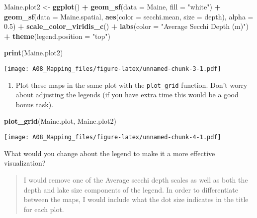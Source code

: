 \documentclass[]{article}
\newenvironment{Shaded}{\begin{snugshade}}{\end{snugshade}}
\newcommand{\DataTypeTok}[1]{\textcolor[rgb]{0.13,0.29,0.53}{#1}}
\newcommand{\FloatTok}[1]{\textcolor[rgb]{0.00,0.00,0.81}{#1}}
\newcommand{\KeywordTok}[1]{\textcolor[rgb]{0.13,0.29,0.53}{\textbf{#1}}}
\newcommand{\NormalTok}[1]{#1}
\newcommand{\OperatorTok}[1]{\textcolor[rgb]{0.81,0.36,0.00}{\textbf{#1}}}
\newcommand{\StringTok}[1]{\textcolor[rgb]{0.31,0.60,0.02}{#1}}
\providecommand{\tightlist}{%
  \setlength{\itemsep}{0pt}\setlength{\parskip}{0pt}}
\begin{document}
\begin{Shaded}
\begin{Highlighting}[]
\NormalTok{Maine.plot2 <-}\StringTok{ }\KeywordTok{ggplot}\NormalTok{() }\OperatorTok{+}
\StringTok{  }\KeywordTok{geom_sf}\NormalTok{(}\DataTypeTok{data =}\NormalTok{ Maine, }\DataTypeTok{fill =} \StringTok{"white"}\NormalTok{) }\OperatorTok{+}
\StringTok{  }\KeywordTok{geom_sf}\NormalTok{(}\DataTypeTok{data =}\NormalTok{ Maine.spatial, }\KeywordTok{aes}\NormalTok{(}\DataTypeTok{color =}\NormalTok{ secchi.mean, }\DataTypeTok{size =}\NormalTok{ depth), }
          \DataTypeTok{alpha =} \FloatTok{0.5}\NormalTok{) }\OperatorTok{+}
\StringTok{  }\KeywordTok{scale_color_viridis_c}\NormalTok{() }\OperatorTok{+}
\StringTok{  }\KeywordTok{labs}\NormalTok{(}\DataTypeTok{color =} \StringTok{"Average Secchi Depth (m)"}\NormalTok{) }\OperatorTok{+}
\StringTok{  }\KeywordTok{theme}\NormalTok{(}\DataTypeTok{legend.position =} \StringTok{"top"}\NormalTok{)}

\KeywordTok{print}\NormalTok{(Maine.plot2)}
\end{Highlighting}
\end{Shaded}

\texttt{[image: A08\_Mapping\_files/figure-latex/unnamed-chunk-3-1.pdf]}

\begin{enumerate}
\def\labelenumi{\arabic{enumi}.}
\setcounter{enumi}{7}
\tightlist
\item
  Plot these maps in the same plot with the \texttt{plot\_grid}
  function. Don't worry about adjusting the legends (if you have extra
  time this would be a good bonus task).
\end{enumerate}

\begin{Shaded}
\begin{Highlighting}[]
\KeywordTok{plot_grid}\NormalTok{(Maine.plot, Maine.plot2)}
\end{Highlighting}
\end{Shaded}

\texttt{[image: A08\_Mapping\_files/figure-latex/unnamed-chunk-4-1.pdf]}

What would you change about the legend to make it a more effective
visualization?

\begin{quote}
I would remove one of the Average secchi depth scales as well as both
the depth and lake size components of the legend. In order to
differentiate between the maps, I would include what the dot size
indicates in the title for each plot.
\end{quote}
\end{document}
